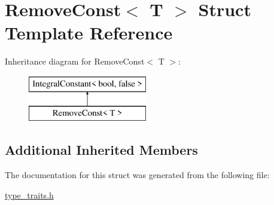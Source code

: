 \hypertarget{struct_remove_const}{}\section{Remove\+Const$<$ T $>$ Struct Template Reference}
\label{struct_remove_const}
Inheritance diagram for Remove\+Const$<$ T $>$\+:\begin{figure}[H]
\begin{center}
\leavevmode
\includegraphics[height=2.000000cm]{struct_remove_const}
\end{center}
\end{figure}
\subsection*{Additional Inherited Members}


The documentation for this struct was generated from the following file\+:\begin{DoxyCompactItemize}
\item 
\hyperlink{type__traits_8h}{type\+\_\+traits.\+h}\end{DoxyCompactItemize}
